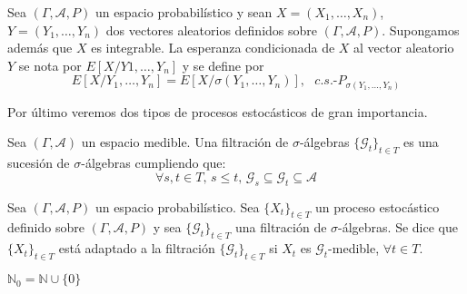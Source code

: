 \begin{definicion}
Sea $(\Gamma, \mathcal{A}, P)$ un espacio probabilístico y sean $X = (X_1,\ldots ,X_n)$, $Y=(Y_1,\ldots ,Y_n)$ dos vectores aleatorios definidos sobre $(\Gamma, \mathcal{A}, P)$. Supongamos además que $X$ es integrable. La esperanza condicionada de $X$ al vector aleatorio $Y$ se nota por $E[X/Y1,\ldots ,Y_n]$ y se define por
$$E[X/Y_1,\ldots ,Y_n]=E[X/\sigma(Y_1,\ldots ,Y_n)], \text{ }c.s.\text{-}P_{\sigma(Y_1,\ldots ,Y_n)}$$ 
\end{definicion}

Por último veremos dos tipos de procesos estocásticos de gran importancia.

\begin{definicion}
Sea $(\Gamma , \mathcal{A})$ un espacio medible. Una filtración de $\sigma$-álgebras $\{\mathscr{G}_t\}_{t\in T}$ es una sucesión de $\sigma$-álgebras cumpliendo que:
$$\forall s,t\in T\text{, } s\leq t \text{, } \mathscr{G}_s\subseteq\mathscr{G}_{t}\subseteq\mathcal{A}$$
\end{definicion}

\begin{definicion}
Sea $(\Gamma , \mathcal{A}, P)$ un espacio probabilístico. Sea $\{X_t\}_{t\in T}$ un proceso estocástico definido sobre $(\Gamma , \mathcal{A}, P)$ y sea $\{\mathscr{G}_t\}_{t\in T}$ una filtración de $\sigma$-álgebras. Se dice que $\{X_t\}_{t\in T}$ está adaptado a la filtración $\{\mathscr{G}_t\}_{t\in T}$ si $X_t$ es $\mathscr{G}_t$-medible, $\forall t\in T$.
\end{definicion}

\begin{notacion}
$\mathds{N}_0 = \mathds{N}\cup \{0\}$
\end{notacion}

